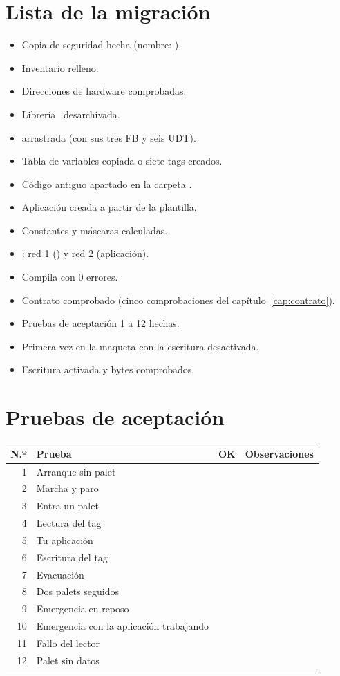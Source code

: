 \section{Lista de la migración}
\begin{itemize}[label=$\square$,itemsep=4pt]
\item Copia de seguridad hecha (nombre: \dotfill).
\item Inventario relleno.
\item Direcciones de hardware comprobadas.
\item Librería \vlib\ desarchivada.
\item {} arrastrada (con sus tres FB y seis UDT).
\item Tabla de variables copiada o siete tags creados.
\item Código antiguo apartado en la carpeta .
\item Aplicación creada a partir de la plantilla.
\item Constantes  y máscaras calculadas.
\item {}: red 1 () y red 2 (aplicación).
\item Compila con 0 errores.
\item Contrato comprobado (cinco comprobaciones del capítulo~\ref{cap:contrato}).
\item Pruebas de aceptación 1 a 12 hechas.
\item Primera vez en la maqueta con la escritura desactivada.
\item Escritura activada y bytes comprobados.
\end{itemize}

\section{Pruebas de aceptación}
\begin{center}
\renewcommand{\arraystretch}{1.5}
\begin{tabular}{|r|p{6.2cm}|c|p{4.8cm}|}
\hline
N.º & Prueba & OK & Observaciones \\ \hline
1 & Arranque sin palet & & \\ \hline
2 & Marcha y paro & & \\ \hline
3 & Entra un palet & & \\ \hline
4 & Lectura del tag & & \\ \hline
5 & Tu aplicación & & \\ \hline
6 & Escritura del tag & & \\ \hline
7 & Evacuación & & \\ \hline
8 & Dos palets seguidos & & \\ \hline
9 & Emergencia en reposo & & \\ \hline
10 & Emergencia con la aplicación trabajando & & \\ \hline
11 & Fallo del lector & & \\ \hline
12 & Palet sin datos & & \\ \hline
\end{tabular}
\end{center}
